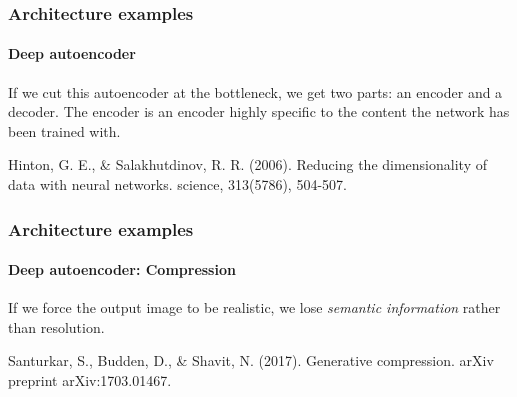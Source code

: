 \documentclass[9pt]{beamer}
\begin{document}
\begin{frame}
  \frametitle{Architecture examples}

  \framesubtitle{Deep autoencoder}

  \begin{center}
  \end{center}

  \medskip

  If we cut this autoencoder at the bottleneck, we get two parts: an
  encoder and a decoder. The encoder is an encoder highly specific to
  the content the network has been trained with.

  \bigskip

  {\footnotesize Hinton, G. E., \& Salakhutdinov,
    R. R. (2006). Reducing the dimensionality of data with neural
    networks. science, 313(5786), 504-507.}
\end{frame}

\begin{frame}
  \frametitle{Architecture examples}

  \framesubtitle{Deep autoencoder: Compression}

  \begin{center}
  \end{center}

  \medskip

  If we force the output image to be realistic, we lose
  \emph{semantic information} rather than resolution.

  \bigskip

  {\footnotesize Santurkar, S., Budden, D., \& Shavit,
    N. (2017). Generative compression. arXiv preprint
    arXiv:1703.01467.}
\end{frame}
\end{document}
